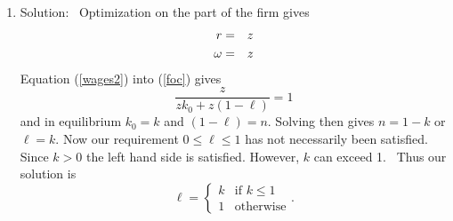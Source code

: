 \documentclass[12pt]{article}
\begin{document}
\begin{enumerate}
\begin{enumerate}
so 
\begin{eqnarray*}
\ell &=&\gamma \\
k &=&k_{0} \\
c &=&y=zk^{\gamma }n^{1-\gamma } \\
\omega &=&z\left( 1-\gamma \right) \left( \frac{k}{n}\right) ^{\gamma } \\
r &=&z\gamma \left( \frac{n}{k}\right) ^{1-\gamma }
\end{eqnarray*}%
There are a couple of things to notice. First, we have solved for every item
that the definition calls for. Second, in listing $\ell $ through $r$ we
have done it in such a way that the expressions include no terms that have
not previously been defined in terms of the model's parameters. Third, we
have one constraint that we have not yet dealt with, $0\leq \ell \leq 1.$
However since $0<\gamma <1$ this is satisfied. \ Finally, we are sloppy here
in that we ignore second or conditions. (Are these solutions maximums or
minimums?) You can always ignore second order conditions when not explicitly
asked for. However, be aware that they are required to actually be rigorous.

\item Solution: \ Optimization on the part of the firm gives 
\begin{eqnarray}
r &=&z  \label{wages2} \\
\omega &=&z  \notag
\end{eqnarray}%
Equation (\ref{wages2}) into (\ref{foc}) gives 
\begin{equation*}
\frac{z}{zk_{0}+z\left( 1-\ell \right) }=1
\end{equation*}%
and in equilibrium $k_{0}=k$ and $\left( 1-\ell \right) =n$. Solving then
gives $n=1-k$ or $\ell =k$. Now our requirement $0\leq \ell \leq 1$ has not
necessarily been satisfied. Since $k>0$ the left hand side is satisfied.
However, $k$ can exceed 1. \ Thus our solution is 
\begin{equation*}
\ell =\left\{ 
\begin{array}{cc}
k & \text{if }k\leq 1 \\ 
1 & \text{otherwise}%
\end{array}%
\right. .
\end{equation*}
\end{enumerate}
\end{enumerate}
\end{document}
